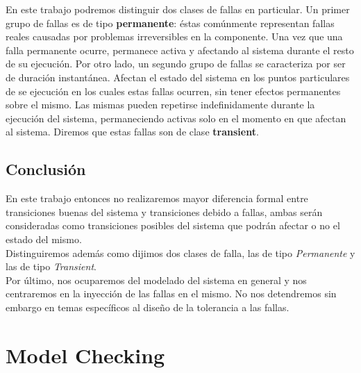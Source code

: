 \documentclass[titlepage, 12pt]{book}
\begin{document}
En este trabajo podremos distinguir dos clases de fallas en particular. Un primer grupo de fallas es de tipo \textbf{permanente}: \'estas com\'unmente representan fallas reales causadas por problemas irreversibles en la componente. Una vez que una falla permanente ocurre, permanece activa y afectando al sistema durante el resto de su ejecuci\'on. Por otro lado, un segundo grupo de fallas se caracteriza por ser de duraci\'on instant\'anea. Afectan el estado del sistema en los puntos particulares de se ejecuci\'on en los cuales estas fallas ocurren, sin tener efectos permanentes sobre el mismo. Las mismas pueden repetirse indefinidamente durante la ejecuci\'on del sistema, permaneciendo activas solo en el momento en que afectan al sistema. Diremos que estas fallas son de clase \textbf{transient}.






\section{Conclusi\'on}
En este trabajo entonces no realizaremos mayor diferencia formal entre transiciones buenas del sistema y transiciones debido a fallas, ambas ser\'an consideradas como transiciones posibles del sistema que podr\'an afectar o no el estado del mismo.\\

Distinguiremos adem\'as como dijimos dos clases de falla, las de tipo \textit{Permanente} y las de tipo \textit{Transient}.\\

Por \'ultimo, nos ocuparemos del modelado del sistema en general y nos centraremos en la inyecci\'on de las fallas en el mismo. No nos detendremos sin embargo en temas espec\'ificos al dise\~no de la tolerancia a las fallas.











\chapter{Model Checking}
\end{document}
